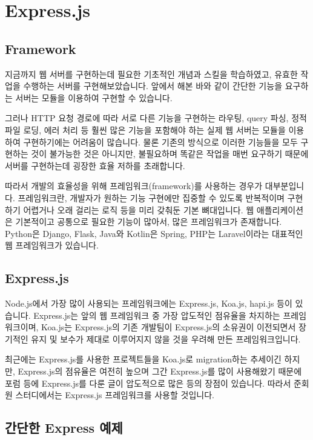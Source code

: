 \section{Express.js}\label{sect:express-js}

\subsection*{Framework}

지금까지 웹 서버를 구현하는데 필요한 기초적인 개념과 스킬을 학습하였고, 유효한 작업을 수행하는 서버를 구현해보았습니다. 앞에서 해본 바와 같이 간단한 기능을 요구하는 서버는  모듈을 이용하여 구현할 수 있습니다.

그러나 HTTP 요청 경로에 따라 서로 다른 기능을 구현하는 라우팅, query 파싱, 정적 파일 로딩, 에러 처리 등 훨씬 많은 기능을 포함해야 하는 실제 웹 서버는  모듈을 이용하여 구현하기에는 어려움이 많습니다. 물론 기존의 방식으로 이러한 기능들을 모두 구현하는 것이 불가능한 것은 아니지만, 불필요하며 똑같은 작업을 매번 요구하기 때문에 서버를 구현하는데 굉장한 효율 저하를 초래합니다.

따라서 개발의 효율성을 위해 프레임워크(framework)를 사용하는 경우가 대부분입니다. 프레임워크란, 개발자가 원하는 기능 구현에만 집중할 수 있도록 반복적이며 구현하기 어렵거나 오래 걸리는 로직 등을 미리 갖춰둔 기본 뼈대입니다. 웹 애플리케이션은 기본적이고 공통으로 필요한 기능이 많아서, 많은 프레임워크가 존재합니다. Python은 Django, Flask, Java와 Kotlin은 Spring, PHP는 Laravel이라는 대표적인 웹 프레임워크가 있습니다.

\subsection*{Express.js}

Node.js에서 가장 많이 사용되는 프레임워크에는 Express.js, Koa.js, hapi.js 등이 있습니다. Express.js는 앞의 웹 프레임워크 중 가장 압도적인 점유율을 차지하는 프레임워크이며, Koa.js는 Express.js의 기존 개발팀이 Express.js의 소유권이 이전되면서 장기적인 유지 및 보수가 제대로 이루어지지 않을 것을 우려해 만든 프레임워크입니다.

최근에는 Express.js를 사용한 프로젝트들을 Koa.js로 migration하는 추세이긴 하지만, Express.js의 점유율은 여전히 높으며 그간 Express.js를 많이 사용해왔기 때문에 포럼 등에 Express.js를 다룬 글이 압도적으로 많은 등의 장점이 있습니다. 따라서 준회원 스터디에서는 Express.js 프레임워크를 사용할 것입니다.

\subsection*{간단한 Express 예제}


